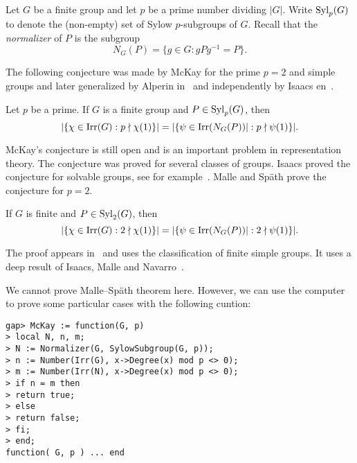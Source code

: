\chapter{}

\label{McKay}

Let $G$ be a finite group and let $p$ be a prime number dividing
$|G|$. Write $\mathrm{Syl}_p(G)$ to denote the (non-empty) set of Sylow 
$p$-subgroups of $G$. Recall that 
the \emph{normalizer} of $P$ is the subgroup
\[
N_G(P)=\{g\in G:gPg^{-1}=P\}.
\]

The following conjecture was made by McKay for the prime $p=2$ and simple groups 
and later generalized by Alperin in~\cite{MR0404417} and independently
by Isaacs en~\cite{MR332945}. 

\begin{conjecture}[McKay]
Let $p$ be a prime. If  
$G$ is a finite group and $P\in\mathrm{Syl}_p(G)$, then 
\[
|\{\chi\in\operatorname{Irr}(G):p\nmid \chi(1)\}|
=|\{\psi\in\operatorname{Irr}(N_G(P))|:p\nmid\psi(1)\}|.
\]
\end{conjecture}

McKay's conjecture is still open and is an important problem in representation theory. 
The conjecture was proved for several classes of groups. Isaacs 
proved the conjecture for solvable groups, see for example~\cite{MR332945,MR3791517}. 
Malle and Sp\"ath prove the conjecture for $p=2$. 

\begin{theorem}
If $G$ is finite and $P\in\mathrm{Syl}_2(G)$,
then 
\[
|\{\chi\in\operatorname{Irr}(G):2\nmid \chi(1)\}|
=|\{\psi\in\operatorname{Irr}(N_G(P))|:2\nmid\psi(1)\}|.
\]
\end{theorem}

The proof appears in~\cite{MR3549625} and uses the classification of 
finite simple groups. It uses a deep result of 
Isaacs, Malle and Navarro~\cite{MR2336079}. 

We cannot prove Malle--Sp\"ath theorem here. However, 
we can use the computer to prove some particular cases
with the following cuntion: 

\begin{lstlisting}
gap> McKay := function(G, p)
> local N, n, m;
> N := Normalizer(G, SylowSubgroup(G, p));
> n := Number(Irr(G), x->Degree(x) mod p <> 0);
> m := Number(Irr(N), x->Degree(x) mod p <> 0);
> if n = m then
> return true;
> else
> return false;
> fi;
> end;
function( G, p ) ... end
\end{lstlisting}

